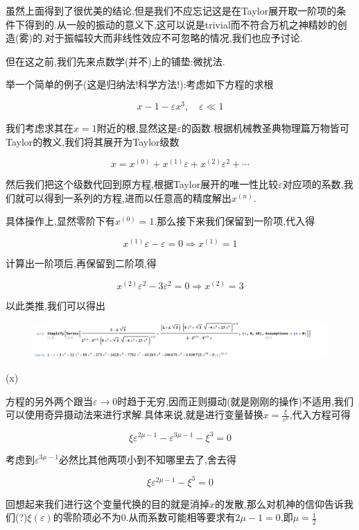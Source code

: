 \documentclass[UTF8]{article}
\begin{document}
	虽然上面得到了很优美的结论,但是我们不应忘记这是在Taylor展开取一阶项的条件下得到的.从一般的振动的意义下,这可以说是trivial而不符合万机之神精妙的创造(雾)的.对于振幅较大而非线性效应不可忽略的情况,我们也应予讨论.
	
	但在这之前,我们先来点数学(并不)上的铺垫:微扰法.
	
	举一个简单的例子(这是归纳法!科学方法!):考虑如下方程的求根
	
	\[x-1-\varepsilon x^3,\quad\varepsilon\ll1\]
	
	我们考虑求其在$x=1$附近的根,显然这是$\varepsilon$的函数.根据机械教圣典物理篇万物皆可Taylor的教义,我们将其展开为Taylor级数
	
	\[x=x^{(0)}+x^{(1)}\varepsilon+x^{(2)}\varepsilon^2+\cdots\]

	然后我们把这个级数代回到原方程,根据Taylor展开的唯一性比较$\varepsilon$对应项的系数,我们就可以得到一系列的方程,进而以任意高的精度解出$x^{(n)}$.
	
	具体操作上,显然零阶下有$x^{(0)}=1$.那么接下来我们保留到一阶项,代入得
	
	\[x^{(1)}\varepsilon-\varepsilon=0 \Rightarrow x^{(1)}=1\]
	
	计算出一阶项后,再保留到二阶项,得
	
	\[x^{(2)}\varepsilon^2-3\varepsilon^2=0\Rightarrow x^{(2)}=3\]
	
	以此类推,我们可以得出

	\begin{figure}[H]
		\centering
		\includegraphics[width=1.25\linewidth]{pics/QQ截图20210720221755}
		\label{fig:qq20210720221755}
	\end{figure}
	
	(x)
	
	方程的另外两个跟当$\varepsilon\to 0$时趋于无穷,因而正则摄动(就是刚刚的操作)不适用,我们可以使用奇异摄动法来进行求解.具体来说,就是进行变量替换$x=\frac{\xi}{\varepsilon^\mu}$,代入方程可得
	
	\[\xi\varepsilon^{2\mu-1}-\varepsilon^{3\mu-1}-\xi^3=0\]
	
	考虑到$\varepsilon^{3\mu-1}$必然比其他两项小到不知哪里去了,舍去得
	
	\[\xi\varepsilon^{2\mu-1}-\xi^3=0\]
	
	回想起来我们进行这个变量代换的目的就是消掉$x$的发散,那么对机神的信仰告诉我们(?)$\xi(\varepsilon)$的零阶项必不为0.从而系数可能相等要求有$2\mu-1=0$,即$\mu=\frac{1}{2}$
	
\end{document}
